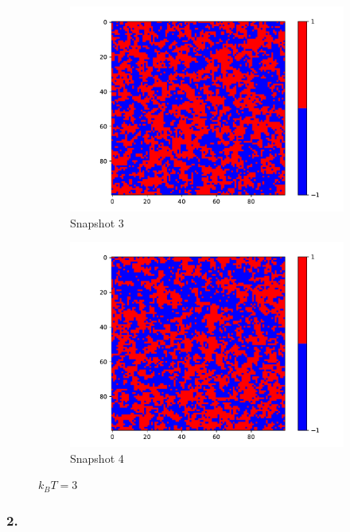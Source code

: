 \begin{figure}
    \begin{subfigure}{0.45\textwidth}
      \centering
      \includegraphics[width=\linewidth]{images/Ising3_3.pdf}
      \caption{Snapshot 3}
      \label{fig:image3}
    \end{subfigure}
    \hfill
    \begin{subfigure}{0.45\textwidth}
      \centering
      \includegraphics[width=\linewidth]{images/Ising3_4.pdf}
      \caption{Snapshot 4}
      \label{fig:image4}
    \end{subfigure}
    \caption{$k_BT = 3$}
    \label{fig:two_by_two}
  \end{figure}


  \subsubsection{2.}

